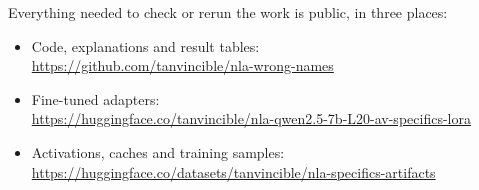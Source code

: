 Everything needed to check or rerun the work is public, in three places:
{\small
\begin{itemize}
\item Code, explanations and result tables:\\ \url{https://github.com/tanvincible/nla-wrong-names}
\item Fine-tuned adapters:\\ \url{https://huggingface.co/tanvincible/nla-qwen2.5-7b-L20-av-specifics-lora}
\item Activations, caches and training samples:\\ \url{https://huggingface.co/datasets/tanvincible/nla-specifics-artifacts}
\end{itemize}}
